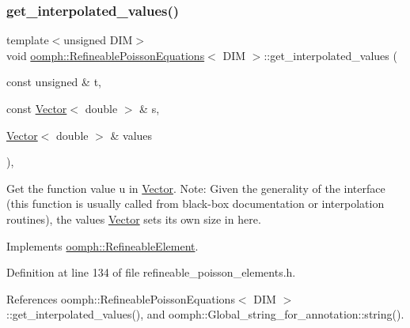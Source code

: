 \subsubsection{\texorpdfstring{get\+\_\+interpolated\+\_\+values()}{get\_interpolated\_values()}\hspace{0.1cm}{\footnotesize\ttfamily [2/2]}}
{\footnotesize\ttfamily template$<$unsigned D\+IM$>$ \\
void \hyperlink{classoomph_1_1RefineablePoissonEquations}{oomph\+::\+Refineable\+Poisson\+Equations}$<$ D\+IM $>$\+::get\+\_\+interpolated\+\_\+values (\begin{DoxyParamCaption}\item[{const unsigned \&}]{t,  }\item[{const \hyperlink{classoomph_1_1Vector}{Vector}$<$ double $>$ \&}]{s,  }\item[{\hyperlink{classoomph_1_1Vector}{Vector}$<$ double $>$ \&}]{values }\end{DoxyParamCaption})\hspace{0.3cm}{\ttfamily [inline]}, {\ttfamily [virtual]}}



Get the function value u in \hyperlink{classoomph_1_1Vector}{Vector}. Note\+: Given the generality of the interface (this function is usually called from black-\/box documentation or interpolation routines), the values \hyperlink{classoomph_1_1Vector}{Vector} sets its own size in here. 



Implements \hyperlink{classoomph_1_1RefineableElement_ada6f0efe831ffefb1d2829ce01d45bfc}{oomph\+::\+Refineable\+Element}.



Definition at line 134 of file refineable\+\_\+poisson\+\_\+elements.\+h.



References oomph\+::\+Refineable\+Poisson\+Equations$<$ D\+I\+M $>$\+::get\+\_\+interpolated\+\_\+values(), and oomph\+::\+Global\+\_\+string\+\_\+for\+\_\+annotation\+::string().

\mbox{\label{classoomph_1_1RefineablePoissonEquations_a8050a73d9e6450e2b861b3d840f5f6ec}} 
